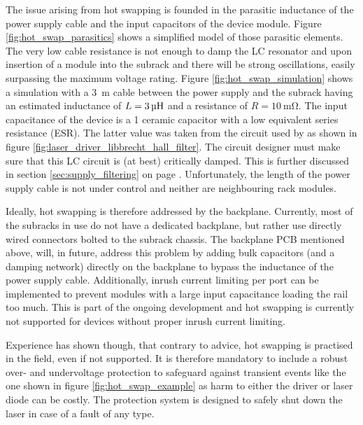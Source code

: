 The issue arising from hot swapping is founded in the parasitic inductance of the power supply cable and the input capacitors of the device module. Figure \ref{fig:hot_swap_parasitics} shows a simplified model of those parasitic elements. The very low cable resistance is not enough to damp the LC resonator and upon insertion of a module into the subrack and there will be strong oscillations, easily surpassing the maximum voltage rating. Figure \ref{fig:hot_swap_simulation} shows a simulation with a \qty{3}{\m} cable between the power supply and the subrack having an estimated inductance of $L=\qty{3}{\uH}$ and a resistance of $R=\qty{10}{\milli\ohm}$. The input capacitance of the device is a \qty{1}{\uF} ceramic capacitor with a low equivalent series resistance (ESR). The latter value was taken from the circuit used by \cite{libbrecht_hall} as shown in figure \ref{fig:laser_driver_libbrecht_hall_filter}. The circuit designer must make sure that this LC circuit is (at best) critically damped. This is further discussed in section \ref{sec:supply_filtering} on page \pageref{eqn:lc_filter_rd}. Unfortunately, the length of the power supply cable is not under control and neither are neighbouring rack modules.

Ideally, hot swapping is therefore addressed by the backplane. Currently, most of the subracks in use do not have a dedicated backplane, but rather use directly wired connectors bolted to the subrack chassis. The backplane PCB mentioned above, will, in future, address this problem by adding bulk capacitors (and a damping network) directly on the backplane to bypass the inductance of the power supply cable. Additionally, inrush current limiting per port can be implemented to prevent modules with a large input capacitance loading the rail too much. This is part of the ongoing development and hot swapping is currently not supported for devices without proper inrush current limiting.

Experience has shown though, that contrary to advice, hot swapping is practised in the field, even if not supported. It is therefore mandatory to include a robust over- and undervoltage protection to safeguard against transient events like the one shown in figure \ref{fig:hot_swap_example} as harm to either the driver or laser diode can be costly. The protection system is designed to safely shut down the laser in case of a fault of any type.

